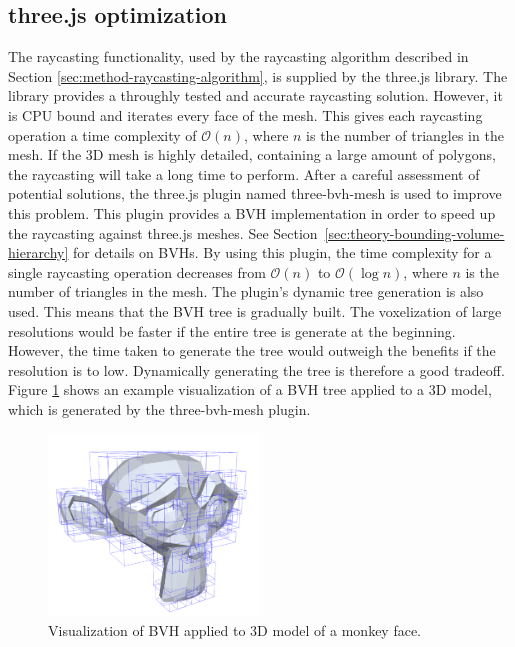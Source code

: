 \subsection{three.js optimization}
\label{sec:three.js-optimization}
The raycasting functionality, used by the raycasting algorithm described in Section \ref{sec:method-raycasting-algorithm}, is supplied by the three.js library. The library provides a throughly tested and accurate raycasting solution. However, it is CPU bound and iterates every face of the mesh. This gives each raycasting operation a time complexity of $\mathcal{O}(n)$, where $n$ is the number of triangles in the mesh. If the 3D mesh is highly detailed, containing a large amount of polygons, the raycasting will take a long time to perform. After a careful assessment of potential solutions, the three.js plugin named three-bvh-mesh \cite{three-bvh-mesh} is used to improve this problem. This plugin provides a BVH implementation in order to speed up the raycasting against three.js meshes. See Section~\ref{sec:theory-bounding-volume-hierarchy} for details on BVHs. By using this plugin, the time complexity for a single raycasting operation decreases from $\mathcal{O}(n)$ to $\mathcal{O}(\log{n})$, where $n$ is the number of triangles in the mesh. The plugin's dynamic tree generation is also used. This means that the BVH tree is gradually built. The voxelization of large resolutions would be faster if the entire tree is generate at the beginning. However, the time taken to generate the tree would outweigh the benefits if the resolution is to low. Dynamically generating the tree is therefore a good tradeoff. Figure \ref{fig:bvh-monkey} shows an example visualization of a BVH tree applied to a 3D model, which is generated by the three-bvh-mesh plugin.

\begin{figure}[ht]
    \centering
    \includegraphics[width=0.5\textwidth]{sections/methodology/figures/bvh-monkey.png}
    \caption{Visualization of BVH applied to 3D model of a monkey face.}
    \label{fig:bvh-monkey}
\end{figure}

